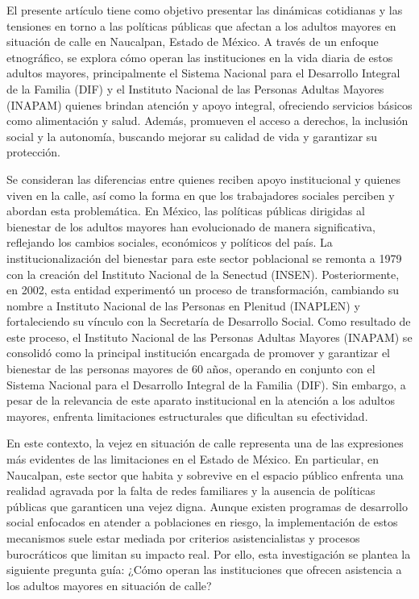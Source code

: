\documentclass[
  spanish,
  11pt,
  a4paper,
]{scrbook}
\begin{document}

El presente artículo tiene como objetivo presentar las dinámicas
cotidianas y las tensiones en torno a las políticas públicas que afectan
a los adultos mayores en situación de calle en Naucalpan, Estado de
México. A través de un enfoque etnográfico, se explora cómo operan las
instituciones en la vida diaria de estos adultos mayores, principalmente
el Sistema Nacional para el Desarrollo Integral de la Familia (DIF) y el
Instituto Nacional de las Personas Adultas Mayores (INAPAM) quienes
brindan atención y apoyo integral, ofreciendo servicios básicos como
alimentación y salud. Además, promueven el acceso a derechos, la
inclusión social y la autonomía, buscando mejorar su calidad de vida y
garantizar su protección.

Se consideran las diferencias entre quienes reciben apoyo institucional
y quienes viven en la calle, así como la forma en que los trabajadores
sociales perciben y abordan esta problemática. En México, las políticas
públicas dirigidas al bienestar de los adultos mayores han evolucionado
de manera significativa, reflejando los cambios sociales, económicos y
políticos del país. La institucionalización del bienestar para este
sector poblacional se remonta a 1979 con la creación del Instituto
Nacional de la Senectud (INSEN). Posteriormente, en 2002, esta entidad
experimentó un proceso de transformación, cambiando su nombre a
Instituto Nacional de las Personas en Plenitud (INAPLEN) y fortaleciendo
su vínculo con la Secretaría de Desarrollo Social. Como resultado de
este proceso, el Instituto Nacional de las Personas Adultas Mayores
(INAPAM) se consolidó como la principal institución encargada de
promover y garantizar el bienestar de las personas mayores de 60 años,
operando en conjunto con el Sistema Nacional para el Desarrollo Integral
de la Familia (DIF). Sin embargo, a pesar de la relevancia de este
aparato institucional en la atención a los adultos mayores, enfrenta
limitaciones estructurales que dificultan su efectividad.

En este contexto, la vejez en situación de calle representa una de las
expresiones más evidentes de las limitaciones en el Estado de México. En
particular, en Naucalpan, este sector que habita y sobrevive en el
espacio público enfrenta una realidad agravada por la falta de redes
familiares y la ausencia de políticas públicas que garanticen una vejez
digna. Aunque existen programas de desarrollo social enfocados en
atender a poblaciones en riesgo, la implementación de estos mecanismos
suele estar mediada por criterios asistencialistas y procesos
burocráticos que limitan su impacto real. Por ello, esta investigación
se plantea la siguiente pregunta guía: ¿Cómo operan las instituciones
que ofrecen asistencia a los adultos mayores en situación de calle?
\end{document}
